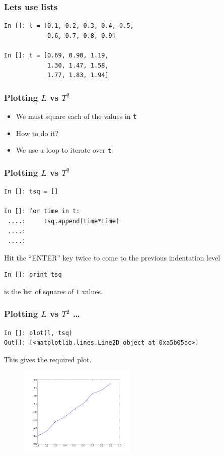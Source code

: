 \documentclass[14pt,compress]{beamer}
\newcounter{time}
\newcommand{\typ}[1]{\lstinline{#1}}
\newcommand{\kwrd}[1]{ \texttt{\textbf{\color{blue}{#1}}}  }
\begin{document}
\begin{frame}[fragile]
\frametitle{Lets use lists}
\begin{lstlisting}
In []: l = [0.1, 0.2, 0.3, 0.4, 0.5, 
            0.6, 0.7, 0.8, 0.9]

In []: t = [0.69, 0.90, 1.19, 
            1.30, 1.47, 1.58, 
            1.77, 1.83, 1.94]
\end{lstlisting}
\end{frame}

\begin{frame}[fragile]
\frametitle{Plotting $L$ vs $T^2$}
\begin{itemize}
\item We must square each of the values in \typ{t}
\item How to do it?
\item We use a \kwrd{for} loop to iterate over \typ{t}
\end{itemize}
\end{frame}

\begin{frame}[fragile]
\frametitle{Plotting $L$ vs $T^2$}
\begin{lstlisting}
In []: tsq = []

In []: for time in t:
 ....:     tsq.append(time*time)
 ....:
 ....:
\end{lstlisting}
Hit the ``ENTER'' key twice to come to the previous indentation level
\begin{lstlisting}
In []: print tsq
\end{lstlisting}
\kwrd{tsq} is the list of squares of \typ{t} values.
\end{frame}

\begin{frame}[fragile]
\frametitle{Plotting $L$ vs $T^2$ \ldots}
\begin{lstlisting}
In []: plot(l, tsq)
Out[]: [<matplotlib.lines.Line2D object at 0xa5b05ac>]
\end{lstlisting}
This gives the required plot. 
\begin{figure}
\includegraphics[width=2.2in]{data/L-TSq-limited.png}
\end{figure}
\end{frame}
\end{document}
